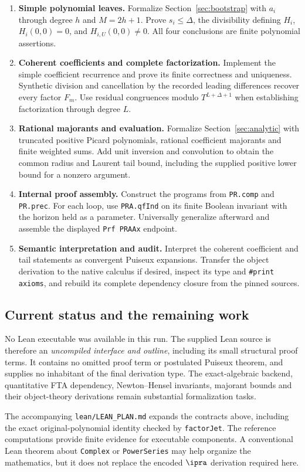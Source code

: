 \begin{enumerate}
\item \textbf{Simple polynomial leaves.}
Formalize Section~\ref{sec:bootstrap} with \(a_i\) through degree \(h\)
and \(M=2h+1\).  Prove \(s_i\le\Delta\), the divisibility defining \(H_i\),
\(H_i(0,0)=0\), and \(H_{i,U}(0,0)\ne0\).
All four conclusions are finite polynomial assertions.

\item \textbf{Coherent coefficients and complete factorization.}
Implement the simple coefficient recurrence and prove its finite
correctness and uniqueness.  Synthetic division and cancellation by
the recorded leading differences recover every factor \(F_m\).
Use residual congruences modulo \(T^{L+\Delta+1}\) when establishing
factorization through degree \(L\).

\item \textbf{Rational majorants and evaluation.}
Formalize Section~\ref{sec:analytic} with truncated positive Picard
polynomials, rational coefficient majorants and finite weighted sums.
Add unit inversion and convolution to obtain the common radius and
Laurent tail bound, including the supplied positive lower bound
for a nonzero argument.

\item \textbf{Internal proof assembly.}
Construct the programs from \texttt{PR.comp} and \texttt{PR.prec}.
For each loop, use \texttt{PRA.qfInd} on its finite Boolean invariant
with the horizon held as a parameter.  Universally generalize afterward
and assemble the displayed \texttt{Prf PRAAx} endpoint.

\item \textbf{Semantic interpretation and audit.}
Interpret the coherent coefficient and tail statements as convergent
Puiseux expansions.  Transfer the object derivation to the native
calculus if desired, inspect its type and \texttt{\#print axioms},
and rebuild its complete dependency closure from the pinned sources.
\end{enumerate}

\subsection{Current status and the remaining work}

No Lean executable was available in this run.  The supplied Lean source
is therefore an \emph{uncompiled interface and outline}, including its
small structural proof terms.  It contains no omitted proof term or
postulated Puiseux theorem, and supplies no inhabitant of the final
derivation type.  The exact-algebraic backend, quantitative FTA dependency,
Newton--Hensel invariants, majorant bounds and their object-theory
derivations remain substantial formalization tasks.

The accompanying \texttt{lean/LEAN\_PLAN.md} expands the contracts above,
including the exact original-polynomial identity checked by
\texttt{factorJet}.  The reference computations provide finite evidence
for executable components.  A conventional Lean theorem about
\texttt{Complex} or \texttt{PowerSeries} may help organize the mathematics,
but it does not replace the encoded \(\ipra\) derivation required here.

